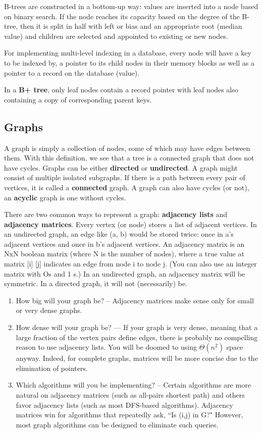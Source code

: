\documentclass{article}
\begin{document}
    
    B-trees are constructed in a bottom-up way: values are inserted into a node based on binary search. If the node reaches its capacity based on the degree of the B-tree, then it is split in half with left or bias and an appropriate root (median value) and children are selected and appointed to existing or new nodes.
    
    For implementing multi-level indexing in a database, every node will have a key to be indexed by, a pointer to its child nodes in their memory blocks as well as a pointer to a record on the database (value).
    
    In a \textbf{B+ tree}, only leaf nodes contain a record pointer with leaf nodes also containing a copy of corresponding parent keys.
    
    \subsection{Graphs}
    A graph is simply a collection of nodes, some of which may have edges between them. With this definition, we see that a tree is a connected graph that does not have cycles. Graphs can be either \textbf{directed} or \textbf{undirected}. A graph might consist of multiple isolated subgraphs. If there is a path between every pair of vertices, it is called a \textbf{connected} graph. A graph can also have cycles (or not), an \textbf{acyclic} graph is one without cycles. 
    
    There are two common ways to represent a graph: \textbf{adjacency lists} and \textbf{adjacency matrices}. Every vertex (or node) stores a list of adjacent vertices. In an undirected graph, an edge like (a, b) would be stored twice: once in a's adjacent vertices and once in b's adjacent vertices. An adjacency matrix is an NxN boolean matrix (where N is the number of nodes), where a true value at matrix [i] [j] indicates an edge from node i to node j. (You can also use an integer matrix with Os and 1 s.) In an undirected graph, an adjacency matrix will be symmetric. In a directed graph, it will not (necessarily) be. 
    
    \begin{enumerate}
        \item How big will your graph be? – Adjacency matrices make sense only for small or very dense graphs.
        \item How dense will your graph be? –– If your graph is very dense, meaning that a large fraction of the vertex pairs define edges, there is probably no compelling reason to use adjacency lists. You will be doomed to using $\Theta(n^2)$ space anyway. Indeed, for complete graphs, matrices will be more concise due to the elimination of pointers.
        \item Which algorithms will you be implementing? – Certain algorithms are more natural on adjacency matrices (such as all-pairs shortest path) and others favor adjacency lists (such as most DFS-based algorithms). Adjacency matrices win for algorithms that repeatedly ask, ``Is (i,j) in G?" However, most graph algorithms can be designed to eliminate such queries.
    \end{enumerate}
    
\end{document}
